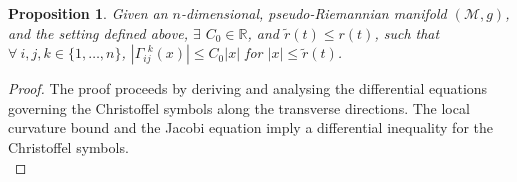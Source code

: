 \documentclass[pdflatex,sn-mathphys-num]{sn-jnl}
\newtheorem{prop}[theorem]{Proposition}
\theoremstyle{definition}
\begin{document}
\begin{prop}\label{prop:2}
    Given an $n$-dimensional, pseudo-Riemannian manifold $(\mathcal{M},g)$, and the setting defined above, $\exists$ $ C_0 \in \mathbb{R}$, and $\tilde{r}(t) \leq r(t)$, such that $\forall~i,j,k \in \{1,\dots,n\} $, $ |\Gamma_{ij}^{~~k}(x)| \leq C_0|x|$ for $|x| \leq \tilde{r}(t)$.
\end{prop}
\begin{proof}
The proof proceeds by deriving and analysing the differential equations governing the Christoffel symbols along the transverse directions. The local curvature bound and the Jacobi equation imply a differential inequality for the Christoffel symbols.\\



\end{proof}
\end{document}
